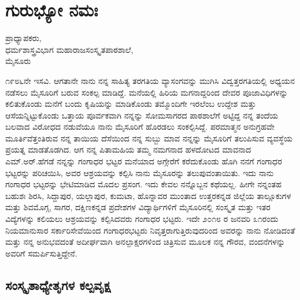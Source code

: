 \chapter{ಗುರುಭ್ಯೋ ನಮಃ}

\begin{center}
\smallskip

ಪ್ರಾಧ್ಯಾಪಕರು,\\ 
ಧರ್ಮಶಾಸ್ತ್ರವಿಭಾಗ
ಮಹಾರಾಜಸಂಸ್ಕೃತಪಾಠಶಾಲೆ,\\ 
ಮೈಸೂರು
\end{center}

೧೯೮೬ನೇ ಇಸವಿ. ಆಗತಾನೇ ನಾನು ನನ್ನ ಸಾಹಿತ್ಯ ತರಗತಿಯ ವ್ಯಾಸಂಗವನ್ನು ಮುಗಿಸಿ ವಿದ್ವತ್ತರಗತಿಯಲ್ಲಿ ಅಧ್ಯಯನ ನಡೆಸಲು ಮೈಸೂರಿಗೆ ಬರುವ ಸಂಕಲ್ಪ ಮಾಡಿದ್ದೆ. ಮನೆಯಲ್ಲಿ ಹಿರಿಯ ಮಗನಾದ್ದರಿಂದ ದೇವರ ಪೂಜಾವಿಧಿಗಳನ್ನು ಕಲಿತುಕೊಂಡು ಮನೆಗೆ ಬಂದು ಕೃಷಿಯನ್ನು ಮಾಡಿಕೊಂಡು ತಮ್ಮೊಂದಿಗೇ ಇರಲೆಂಬ ಉದ್ದೇಶ ಮತ್ತು ಆಸೆಯನ್ನಿಟ್ಟುಕೊಂಡು ಒತ್ತಾಯ ಪೂರ್ವಕವಾಗಿ ನನ್ನನ್ನು ಸೋಮಸಾಗರದ ಪಾಠಶಾಲೆಗೆ ಅಟ್ಟಿದ್ದ ನನ್ನ ತಂದೆಯ ಬಲವಾದ ವಿರೋಧದ ನಡುವೆಯೂ ನಾನು ಮೈಸೂರಿಗೆ ಹೊರಡಲು ಸಂಕಲ್ಪಿಸಿದ್ದೆ. ಪರಮಾತ್ಮನ ಅನುಗ್ರಹವೇ ಮೂರ್ತಿವೆತ್ತಂತಿರುವ ನನ್ನ ತಾಯಿಯ ದೆಸೆಯಿಂದ ನನ್ನ ಸುಬ್ಬು ಮಾವ ನನ್ನನ್ನು ಮೈಸೂರಿಗೆ ತಲುಪಿಸುವ ವ್ಯವಸ್ಥೆಯ ಪ್ರಯತ್ನ ಮಾಡತೊಡಗಿದ. ಆಗ ನನ್ನ ಪಿತಾಮಹಿಯ ತಮ್ಮ ನಮಗನಾದ ಹಳದೋಟದ ಮಾವನಾದ ಎಮ್.ಅರ್.ಹೆಗಡೆ ನನ್ನನ್ನು ಗಂಗಾಧರ ಭಟ್ಟರ ಮನೆಯಾದ ಅಗ್ಗೇರೆಗೆ ಕರೆದುಕೊಂಡು ಹೊಗಿ ನನಗೆ ಗಂಗಾಧರ ಭಟ್ಟರನ್ನು ಪರಿಚಯಿಸಿ, ಅವರ ಆಶ್ರಯವನ್ನು ಕಲ್ಪಿಸಿ ನಾನು ಮೈಸೂರನ್ನು ತಲುಪುವಂತಾಯಿತು. ಇದು ನಾನು ಗಂಗಾಧರ ಭಟ್ಟರನ್ನು ಭೇಟಿಮಾಡಿದ ಮೊದಲ ಪ್ರಸಂಗ. ಇದು ಕೇವಲ ನನ್ನೊಬ್ಬನ ಕಥೆಯಲ್ಲ. ಹೀಗೇ ನನ್ನಂತಹ ಬಹುಶಃ ಶಿರಸಿ, ಸಿದ್ದಾಪುರ, ಯಲ್ಲಾಪುರ, ಕುಮಟಾ, ಹೊನ್ನಾವರ ಮುಂತಾದ ಉತ್ತರಕನ್ನಡ ಜಿಲ್ಲೆಯ ತಾಲ್ಲೂಕುಗಳ ಮತ್ತು ಶಿವಮೊಗ್ಗ, ಸಾಗರ, ದಕ್ಷಿಣಕನ್ನಡ ಪ್ರದೇಶಗಳ ವಿದ್ಯಾರ್ಥಿಗಳಿಗೆ ಮೈಸೂರಿನಲ್ಲಿ ಸಂಸ್ಕೃತ ಮತ್ತು ಇತರ ವಿದ್ಯೆಗಳನ್ನು ಕಲಿಯಲು ಆಶ್ರಯವನ್ನು ಕಲ್ಪಿಸಿದವರು ಗಂಗಾಧರ ಭಟ್ಟರು. ಇದೇ ೨೦೧೮ ರ ಜನವರಿ ೩೧ರಂದು ನಿಯಮಾನುಸಾರ ಸರ್ಕಾರಿಸೇವೆಯಿಂದ ಗಂಗಾಧರಭಟ್ಟರು ನಿವೃತ್ತರಾಗುತ್ತಿರುವುದರಿಂದ ಅವರನ್ನು ನಾನು ನೋಡಿದಂತೆ ಮತ್ತು ನನ್ನ ಅನುಭವದಂತೆ ಅದೀರ್ಘವಾಗಿ ಅನಲ್ಪಾಕ್ಷರಗಳಿಂದ ಚಿತ್ರಿಸುವ ಮೂಲಕ ನನ್ನ ಗೌರವ, ವಂದನೆಗಳನ್ನು ಅವರಿಗೆ ಸಮರ್ಪಿಸುತ್ತಿದ್ದೇನೆ.

\section*{ಸಂಸ್ಕೃತಾಧ್ಯೇತೃಗಳ ಕಲ್ಪವೃಕ್ಷ}

